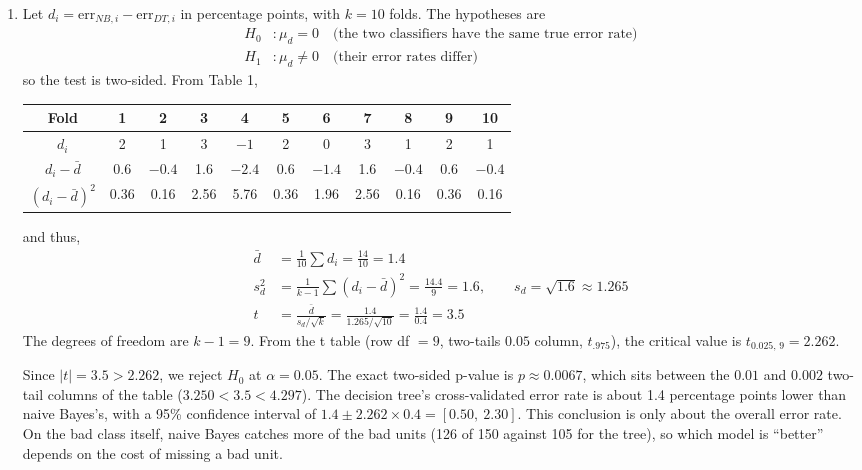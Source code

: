 \documentclass[12pt,letterpaper, onecolumn]{exam}
\begin{document}
\begin{questions}
\begin{solution}
\begin{enumerate}[1.]
            \item Let $d_i = \text{err}_{NB,i}-\text{err}_{DT,i}$ in percentage points, with $k=10$ folds. The hypotheses are
            \begin{align*}
                H_0&: \mu_d = 0 \quad \text{(the two classifiers have the same true error rate)}\\
                H_1&: \mu_d \neq 0 \quad \text{(their error rates differ)}
            \end{align*}
            so the test is two-sided. From Table 1,
            \begin{center}
                {\small
                \begin{tabular}{|c|c|c|c|c|c|c|c|c|c|c|}
                    \hline Fold & 1 & 2 & 3 & 4 & 5 & 6 & 7 & 8 & 9 & 10 \\ \hline
                    $d_i$ & 2 & 1 & 3 & $-1$ & 2 & 0 & 3 & 1 & 2 & 1 \\
                    $d_i-\bar d$ & 0.6 & $-0.4$ & 1.6 & $-2.4$ & 0.6 & $-1.4$ & 1.6 & $-0.4$ & 0.6 & $-0.4$ \\
                    $(d_i-\bar d)^2$ & 0.36 & 0.16 & 2.56 & 5.76 & 0.36 & 1.96 & 2.56 & 0.16 & 0.36 & 0.16 \\ \hline
                \end{tabular}
                }
            \end{center}
            and thus,
            \begin{align*}
                \bar d &= \tfrac{1}{10}\textstyle\sum d_i = \tfrac{14}{10} = 1.4\\
                s_d^2 &= \tfrac{1}{k-1}\textstyle\sum (d_i-\bar d)^2 = \tfrac{14.4}{9} = 1.6, \qquad s_d = \sqrt{1.6}\approx 1.265\\
                t &= \frac{\bar d}{s_d/\sqrt{k}} = \frac{1.4}{1.265/\sqrt{10}} = \frac{1.4}{0.4} = 3.5
            \end{align*}
            The degrees of freedom are $k-1 = 9$. From the t table (row df $=9$, two-tails $0.05$ column, $t_{.975}$), the critical value is $t_{0.025,\,9} = 2.262$.

            Since $|t| = 3.5 > 2.262$, we reject $H_0$ at $\alpha=0.05$. The exact two-sided p-value is $p\approx 0.0067$, which sits between the $0.01$ and $0.002$ two-tail columns of the table ($3.250 < 3.5 < 4.297$). The decision tree's cross-validated error rate is about 1.4 percentage points lower than naive Bayes's, with a 95\% confidence interval of $1.4 \pm 2.262\times 0.4 = [0.50,\ 2.30]$. This conclusion is only about the overall error rate. On the bad class itself, naive Bayes catches more of the bad units (126 of 150 against 105 for the tree), so which model is ``better'' depends on the cost of missing a bad unit.


\end{enumerate}
\end{solution}
\end{questions}
\end{document}
